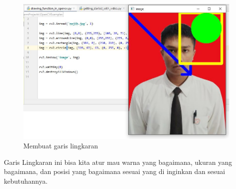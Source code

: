 \begin{figure}[ht]
\centering
\includegraphics[scale=0.55]{figures/2,13.jpg}
\caption{Membuat garis lingkaran}
\label{contoh}
\end{figure}

Garis Lingkaran ini bisa kita atur mau warna yang bagaimana, ukuran yang bagaimana, dan posisi yang bagaimana sesuai yang di inginkan dan sesuai kebutuhannya.

\newpage

